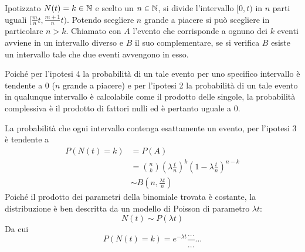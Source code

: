Ipotizzato $N(t)=k\in\mathbb N$ e scelto un $n\in\mathbb N$, si divide l'intervallo $[0,t)$ in $n$ parti uguali $[\frac{m}{n}t,\frac{m+1}{n}t)$. Potendo scegliere $n$ grande a piacere si può scegliere in particolare $n>k$. Chiamato con $A$ l'evento che corrisponde a ognuno dei $k$ eventi avviene in un intervallo diverso e $B$ il suo complementare, se si verifica $B$ esiste un intervallo tale che due eventi avvengono in esso.

Poiché per l'ipotesi 4 la probabilità di un tale evento per uno specifico intervallo è tendente a $0$ ($n$ grande a piacere) e per l'ipotesi 2 la probabilità di un tale evento in qualunque intervallo è calcolabile come il prodotto delle singole, la probabilità complessiva è il prodotto di fattori nulli ed è pertanto uguale a $0$.

La probabilità che ogni intervallo contenga esattamente un evento, per l'ipotesi 3 è tendente a
\begin{align*}
	P(N(t) = k) & = P(A) \\
	& = \binom{n}{k}\left(\lambda\frac{t}{n}\right)^k\left(1-\lambda\frac{t}{n}\right)^{n-k} \\
	& \sim B\left(n,\frac{\lambda t}{n}\right)
\end{align*}
Poiché il prodotto dei parametri della binomiale trovata è costante, la distribuzione è ben descritta da un modello di Poisson di parametro $\lambda t$:
\begin{equation*}
	N(t)\sim P(\lambda t)
\end{equation*}
Da cui
\begin{equation*}
	P(N(t)=k) = e^{-\lambda t}\frac{\dots}{\dots}\dots
\end{equation*}
